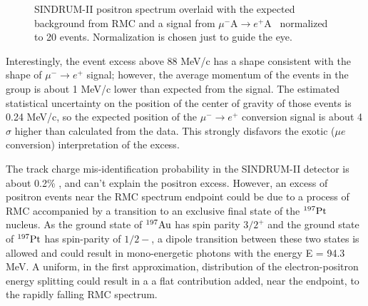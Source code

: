 \documentclass[12pt]{article}
\newcommand {\mumepconv}[1][A] {%
  \def\ArgI{{#1}}%
  \mumepconvRelay
}
\newcommand \mumepconvRelay[1][A]  {\mbox{$\mu^- \textrm{\ArgI} \rightarrow e^+ \textrm{#1}$}}
\newcommand {\Au}[1]     {\mbox{$\rm ^{#1}Au$}}                 %
\begin{document}
\begin{figure}
\caption {
  \label{fig:ana_step2_sindrum_positron_best_fit_signal}
  SINDRUM-II positron spectrum overlaid with the expected background from RMC
  and a signal from \mumepconv\ normalized to 20 events. Normalization is chosen
  just to guide the eye.
}
\end{figure}

Interestingly, the event excess above 88 MeV/c has a shape consistent with the shape
of $\mu^- \rightarrow e^+$ signal; however, the average momentum of the events in the group
is about 1 MeV/c lower than expected from the signal.
The estimated statistical uncertainty on the position of the center of gravity of those
events is 0.24 MeV/c, so the expected position of the $\mu^- \rightarrow e^+$ conversion
signal is about 4$\sigma$ higher than calculated from the data.
This strongly disfavors the exotic ($\mu e$ conversion) interpretation of the excess.

The track charge mis-identification probability in the SINDRUM-II detector
is about 0.2\% \cite{sindrum_ii:Kaulard1998}, and can't explain the positron excess.
%
However, an excess of positron events near the RMC spectrum endpoint could be due
to a process of RMC accompanied by a transition to an exclusive final state
of the $^{197}\rm Pt$ nucleus. As the ground state of \Au{197} has spin parity $3/2^+$
and the ground state of $^{197} \rm Pt$ has spin-parity of $1/2-$, a dipole transition
between these two states is allowed and could result in mono-energetic photons
with the energy E = 94.3 MeV. A uniform, in the first approximation, distribution
of the electron-positron energy splitting could result in a a flat contribution 
added, near the endpoint, to the rapidly falling RMC spectrum. 
\end{document}
